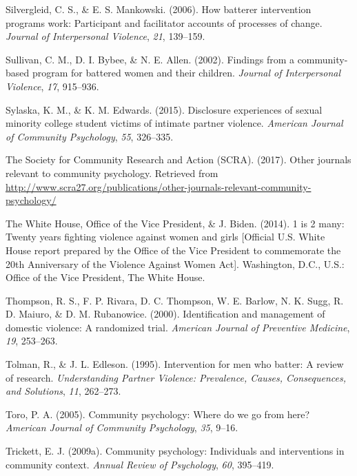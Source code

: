 \documentclass[11pt,]{tufte-book}
\begin{document}
\hypertarget{ref-silvergleid2006batterer}{}
Silvergleid, C. S., \& E. S. Mankowski. (2006). How batterer
intervention programs work: Participant and facilitator accounts of
processes of change. \emph{Journal of Interpersonal Violence},
\emph{21}, 139--159.

\hypertarget{ref-sullivan2002findings}{}
Sullivan, C. M., D. I. Bybee, \& N. E. Allen. (2002). Findings from a
community-based program for battered women and their children.
\emph{Journal of Interpersonal Violence}, \emph{17}, 915--936.

\hypertarget{ref-sylaska2015disclosure}{}
Sylaska, K. M., \& K. M. Edwards. (2015). Disclosure experiences of
sexual minority college student victims of intimate partner violence.
\emph{American Journal of Community Psychology}, \emph{55}, 326--335.

\hypertarget{ref-scra2017other}{}
The Society for Community Research and Action (SCRA). (2017). Other
journals relevant to community psychology. Retrieved from
\url{http://www.scra27.org/publications/other-journals-relevant-community-psychology/}

\hypertarget{ref-biden2014twenty}{}
The White House, Office of the Vice President, \& J. Biden. (2014). 1 is
2 many: Twenty years fighting violence against women and girls
{[}Official U.S. White House report prepared by the Office of the Vice
President to commemorate the 20th Anniversary of the Violence Against
Women Act{]}. Washington, D.C., U.S.: Office of the Vice President, The
White House.

\hypertarget{ref-thompson2000identification}{}
Thompson, R. S., F. P. Rivara, D. C. Thompson, W. E. Barlow, N. K. Sugg,
R. D. Maiuro, \& D. M. Rubanowice. (2000). Identification and management
of domestic violence: A randomized trial. \emph{American Journal of
Preventive Medicine}, \emph{19}, 253--263.

\hypertarget{ref-tolman1995intervention}{}
Tolman, R., \& J. L. Edleson. (1995). Intervention for men who batter: A
review of research. \emph{Understanding Partner Violence: Prevalence,
Causes, Consequences, and Solutions}, \emph{11}, 262--273.

\hypertarget{ref-toro2005community}{}
Toro, P. A. (2005). Community psychology: Where do we go from here?
\emph{American Journal of Community Psychology}, \emph{35}, 9--16.

\hypertarget{ref-trickett2009community}{}
Trickett, E. J. (2009a). Community psychology: Individuals and
interventions in community context. \emph{Annual Review of Psychology},
\emph{60}, 395--419.
\end{document}
